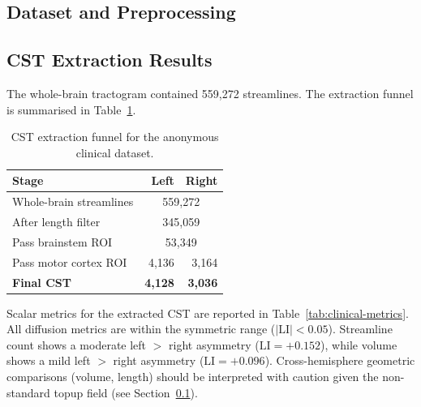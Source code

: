 \subsection{Dataset and Preprocessing}
\label{subsec:clinical-dataset}


\subsection{CST Extraction Results}
\label{subsec:clinical-cst}

The whole-brain tractogram contained 559,272 streamlines. The extraction funnel is summarised in Table~\ref{tab:clinical-funnel}.

\begin{table}[h]
    \centering
    \caption{CST extraction funnel for the anonymous clinical dataset.}
    \label{tab:clinical-funnel}
    \begin{tabular}{lrr}
        \hline
        Stage & Left & Right \\
        \hline
        Whole-brain streamlines & \multicolumn{2}{c}{559,272} \\
        After length filter     & \multicolumn{2}{c}{345,059} \\
        Pass brainstem ROI      & \multicolumn{2}{c}{53,349} \\
        Pass motor cortex ROI   & 4,136 & 3,164 \\
        \textbf{Final CST}      & \textbf{4,128} & \textbf{3,036} \\
        \hline
    \end{tabular}
\end{table}

Scalar metrics for the extracted CST are reported in Table~\ref{tab:clinical-metrics}. All diffusion metrics are within the symmetric range ($|\mathrm{LI}| < 0.05$). Streamline count shows a moderate left $>$ right asymmetry ($\mathrm{LI} = +0.152$), while volume shows a mild left $>$ right asymmetry ($\mathrm{LI} = +0.096$). Cross-hemisphere geometric comparisons (volume, length) should be interpreted with caution given the non-standard topup field (see Section~\ref{subsec:clinical-dataset}).

